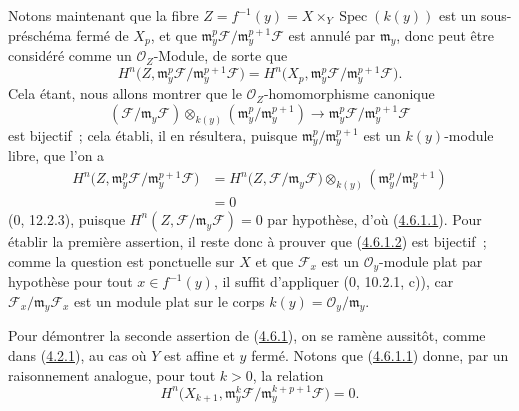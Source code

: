 
Notons maintenant que la fibre
$Z=f^{-1}(y)=X\times_Y\operatorname{Spec}(k(y))$ est un sous-préschéma fermé
de $X_p$, et que
$\mathfrak m_y^p\mathcal F/\mathfrak m_y^{p+1}\mathcal F$ est annulé par
$\mathfrak m_y$, donc peut être considéré comme un $\mathcal O_Z$-Module, de
sorte que
\[
H^n\bigl(Z,\mathfrak m_y^p\mathcal F/
\mathfrak m_y^{p+1}\mathcal F\bigr)
=H^n\bigl(X_p,\mathfrak m_y^p\mathcal F/
\mathfrak m_y^{p+1}\mathcal F\bigr).
\]
Cela étant, nous allons montrer que le $\mathcal O_Z$-homomorphisme canonique
\[
\label{III.4.6.1.2-fr}
(\mathcal F/\mathfrak m_y\mathcal F)
\otimes_{k(y)}(\mathfrak m_y^p/\mathfrak m_y^{p+1})
\longrightarrow
\mathfrak m_y^p\mathcal F/\mathfrak m_y^{p+1}\mathcal F
\tag{4.6.1.2}
\]
est bijectif~; cela établi, il en résultera, puisque
$\mathfrak m_y^p/\mathfrak m_y^{p+1}$ est un $k(y)$-module libre, que l'on a
\[
\begin{split}
H^n\bigl(Z,\mathfrak m_y^p\mathcal F/
\mathfrak m_y^{p+1}\mathcal F\bigr)
&=H^n\bigl(Z,\mathcal F/\mathfrak m_y\mathcal F\bigr)
\otimes_{k(y)}(\mathfrak m_y^p/\mathfrak m_y^{p+1})\\
&=0
\end{split}
\]
(0, 12.2.3), puisque
$H^n(Z,\mathcal F/\mathfrak m_y\mathcal F)=0$ par hypothèse, d'où
(\hyperref[III.4.6.1.1-fr]{4.6.1.1}). Pour établir la première assertion, il
reste donc à prouver que (\hyperref[III.4.6.1.2-fr]{4.6.1.2}) est bijectif~;
comme la question est ponctuelle sur $X$ et que $\mathcal F_x$ est un
$\mathcal O_y$-module plat par hypothèse pour tout $x\in f^{-1}(y)$, il
suffit d'appliquer (0, 10.2.1, c)), car
$\mathcal F_x/\mathfrak m_y\mathcal F_x$ est un module plat sur le corps
$k(y)=\mathcal O_y/\mathfrak m_y$.

Pour démontrer la seconde assertion de (\hyperref[III.4.6.1-fr]{4.6.1}), on
se ramène aussitôt, comme dans (\hyperref[III.4.2.1-fr]{4.2.1}), au cas où
$Y$ est affine et $y$ fermé. Notons que
(\hyperref[III.4.6.1.1-fr]{4.6.1.1}) donne, par un raisonnement analogue,
pour tout $k>0$, la relation
\[
\label{III.4.6.1.3-fr}
H^n\bigl(X_{k+1},
\mathfrak m_y^k\mathcal F/
\mathfrak m_y^{k+p+1}\mathcal F\bigr)=0.
\tag{4.6.1.3}
\]


